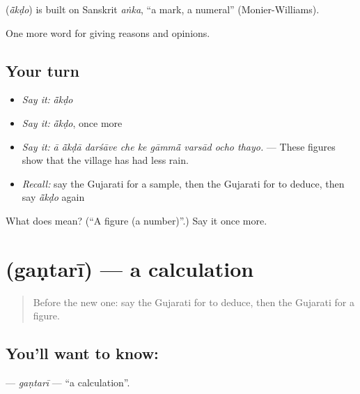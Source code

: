 \begin{cousinweb}
\textbf{} (\emph{ā̃kḍo}) is built on Sanskrit \emph{aṅka}, \textquotedblleft{}a mark, a numeral\textquotedblright{} (Monier-Williams).
\end{cousinweb}

\begin{grammarlens}[title={What you've built}]
One more word for giving reasons and opinions.
\end{grammarlens}

\subsection*{Your turn}
\begin{itemize}
\raggedright
  \item \emph{Say it:} \emph{ā̃kḍo}
  \item \emph{Say it:} \emph{ā̃kḍo}, once more
  \item \emph{Say it:} \emph{ā ā̃kḍā darśāve che ke gāmmā̃ varsād ocho thayo.} — These figures show that the village has had less rain.
  \item \emph{Recall:} say the Gujarati for a sample, then the Gujarati for to deduce, then say \emph{ā̃kḍo} again
\end{itemize}

\begin{tcolorbox}[breakable,colback=teal!4,colframe=teal!35!black,title={Before you move on}]
What does  mean? (\textquotedblleft{}A figure (a number)\textquotedblright{}.) Say it once more.
\end{tcolorbox}
\section[\texorpdfstring{\gu{ગણતરી} (gaṇtarī)}{ગણતરી (gaṇtarī)}]{ (gaṇtarī) — a calculation}

\label{lesson:GU-C363-gantari}



\begin{quote}
Before the new one: say the Gujarati for to deduce, then the Gujarati for a figure.
\end{quote}

\subsection*{You'll want to know: }
\textbf{} — \emph{gaṇtarī} — \textquotedblleft{}a calculation\textquotedblright{}.

